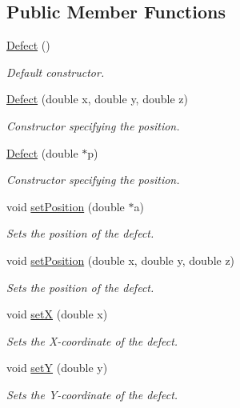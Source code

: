 \subsection*{\-Public \-Member \-Functions}
\begin{DoxyCompactItemize}
\item 
\hyperlink{classDefect_afc84dd2d7250a01746ee67b002dbbad9}{\-Defect} ()
\begin{DoxyCompactList}\small\item\em \-Default constructor. \end{DoxyCompactList}\item 
\hyperlink{classDefect_aaddcb1db4b47037adf2e495665f41bab}{\-Defect} (double x, double y, double z)
\begin{DoxyCompactList}\small\item\em \-Constructor specifying the position. \end{DoxyCompactList}\item 
\hyperlink{classDefect_a5bd123214102a5115c46b0a15653d29b}{\-Defect} (double $\ast$p)
\begin{DoxyCompactList}\small\item\em \-Constructor specifying the position. \end{DoxyCompactList}\item 
void \hyperlink{classDefect_a2d233d13a8a93f6fba463a1fbc1c6c9f}{set\-Position} (double $\ast$a)
\begin{DoxyCompactList}\small\item\em \-Sets the position of the defect. \end{DoxyCompactList}\item 
void \hyperlink{classDefect_ad1a6acd8399d2ecabb7ce2b77623bbec}{set\-Position} (double x, double y, double z)
\begin{DoxyCompactList}\small\item\em \-Sets the position of the defect. \end{DoxyCompactList}\item 
void \hyperlink{classDefect_a5a65f73da6a572d9e7109b31239e441d}{set\-X} (double x)
\begin{DoxyCompactList}\small\item\em \-Sets the \-X-\/coordinate of the defect. \end{DoxyCompactList}\item 
void \hyperlink{classDefect_a268606391a4eaee3de029d2005648b6f}{set\-Y} (double y)
\begin{DoxyCompactList}\small\item\em \-Sets the \-Y-\/coordinate of the defect. \end{DoxyCompactList}\item 

\end{DoxyCompactItemize}
